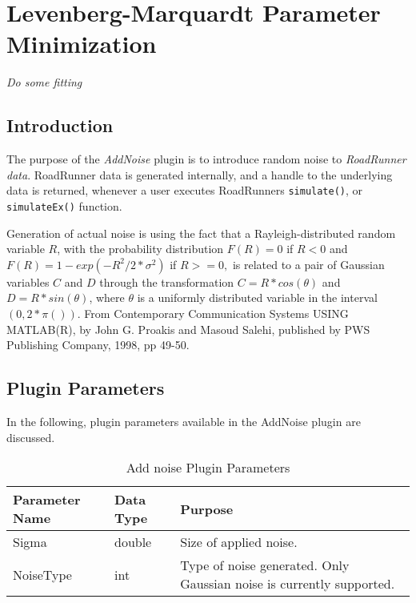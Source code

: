 \chapter{Levenberg-Marquardt Parameter Minimization}
\emph{Do some fitting}
\section{Introduction}
The purpose of the \emph{AddNoise} plugin is to introduce random noise to \emph{RoadRunner data}. RoadRunner data is generated internally, and a handle to the underlying data is returned, whenever a user executes RoadRunners \verb|simulate()|, or \verb|simulateEx()| function. 

Generation of actual noise is using the fact that a Rayleigh-distributed random variable $R$, with
the probability distribution $F(R) = 0$ if $R < 0$ and $F(R) = 1 - exp(-R^2/2*\sigma^2)$ if $R >= 0, $
is related to a pair of Gaussian variables $C$ and $D$ through the transformation $C = R * cos(\theta)$ and
$D = R * sin(\theta)$, where $\theta$ is a uniformly distributed variable
in the interval $(0, 2*\pi())$. From Contemporary Communication Systems
USING MATLAB(R), by John G. Proakis and Masoud Salehi, published by
PWS Publishing Company, 1998, pp 49-50. 

 
\section{Plugin Parameters}
In the following, plugin parameters available in the AddNoise plugin are discussed.

\begin{table}[ht]
\centering %
\begin{tabular}{l l p{7.5cm}} %

Parameter Name & Data Type & Purpose \\ [0.5ex] %
\hline %
Sigma         	& 	double & Size of applied noise. \\
NoiseType      	& 	int    & Type of noise generated. Only Gaussian noise is currently supported. \\

\hline %
\end{tabular}
\caption{Add noise Plugin Parameters} 
\label{table:AddNoisePluginParameters} 
\end{table}


